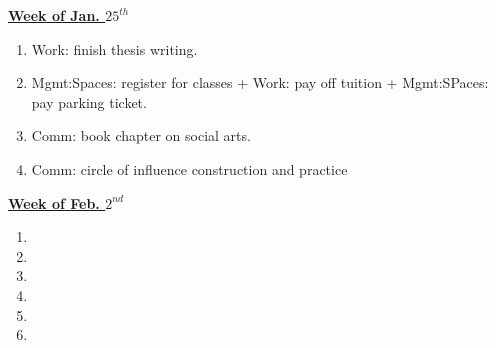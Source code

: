 \documentclass[11pt]{article}
\begin{document}
           {\small \underline{\textbf{Week of Jan. $25^{th}$}} }\\
           \begin{enumerate} 
             \small \item \small Work: finish thesis writing. 
           \item \small Mgmt:Spaces: register for classes + Work: pay off tuition  +  Mgmt:SPaces: pay parking ticket.
           \item \small Comm: book chapter on social arts. 
           \item \small Comm: circle of influence construction and practice 
           \end{enumerate}
           
           {\small \underline{\textbf{Week of Feb. $2^{nd}$}} }\\
           \begin{enumerate}
             \small \item \small 
           \item \small
           \item \small 
           \item \small 
           \item \small 
           \item \small          
           \end{enumerate}
           \newpage
         
\end{document}
